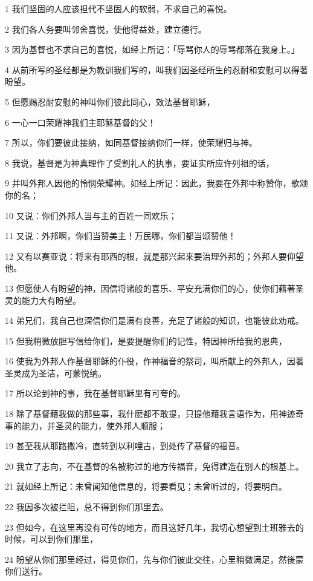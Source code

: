 \par 1 我们坚固的人应该担代不坚固人的软弱，不求自己的喜悦。
\par 2 我们各人务要叫邻舍喜悦，使他得益处，建立德行。
\par 3 因为基督也不求自己的喜悦，如经上所记：「辱骂你人的辱骂都落在我身上。」
\par 4 从前所写的圣经都是为教训我们写的，叫我们因圣经所生的忍耐和安慰可以得著盼望。
\par 5 但愿赐忍耐安慰的神叫你们彼此同心，效法基督耶稣，
\par 6 一心一口荣耀神我们主耶稣基督的父！
\par 7 所以，你们要彼此接纳，如同基督接纳你们一样，使荣耀归与神。
\par 8 我说，基督是为神真理作了受割礼人的执事，要证实所应许列祖的话，
\par 9 并叫外邦人因他的怜悯荣耀神。如经上所记：因此，我要在外邦中称赞你，歌颂你的名；
\par 10 又说：你们外邦人当与主的百姓一同欢乐；
\par 11 又说：外邦啊，你们当赞美主！万民哪，你们都当颂赞他！
\par 12 又有以赛亚说：将来有耶西的根，就是那兴起来要治理外邦的；外邦人要仰望他。
\par 13 但愿使人有盼望的神，因信将诸般的喜乐、平安充满你们的心，使你们藉著圣灵的能力大有盼望。
\par 14 弟兄们，我自己也深信你们是满有良善，充足了诸般的知识，也能彼此劝戒。
\par 15 但我稍微放胆写信给你们，是要提醒你们的记性，特因神所给我的恩典，
\par 16 使我为外邦人作基督耶稣的仆役，作神福音的祭司，叫所献上的外邦人，因著圣灵成为圣洁，可蒙悦纳。
\par 17 所以论到神的事，我在基督耶稣里有可夸的。
\par 18 除了基督藉我做的那些事，我什麽都不敢提，只提他藉我言语作为，用神迹奇事的能力，并圣灵的能力，使外邦人顺服；
\par 19 甚至我从耶路撒冷，直转到以利哩古，到处传了基督的福音。
\par 20 我立了志向，不在基督的名被称过的地方传福音，免得建造在别人的根基上。
\par 21 就如经上所记：未曾闻知他信息的，将要看见；未曾听过的，将要明白。
\par 22 我因多次被拦阻，总不得到你们那里去。
\par 23 但如今，在这里再没有可传的地方，而且这好几年，我切心想望到士班雅去的时候，可以到你们那里，
\par 24 盼望从你们那里经过，得见你们，先与你们彼此交往，心里稍微满足，然後蒙你们送行。
